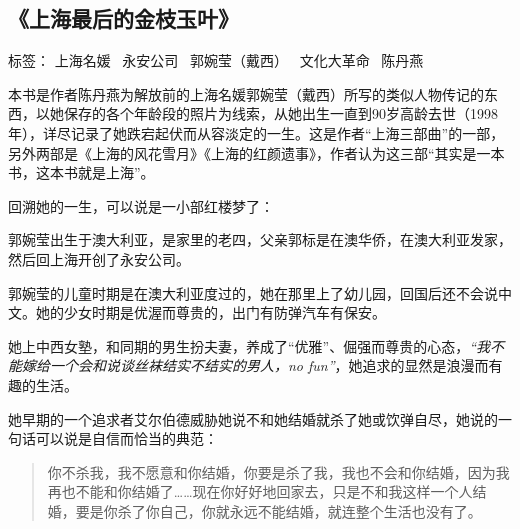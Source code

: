 \subsection{《上海最后的金枝玉叶》}

标签： 上海名媛 \ 永安公司 \ 郭婉莹（戴西） \ 文化大革命 \ 陈丹燕

本书是作者陈丹燕为解放前的上海名媛郭婉莹（戴西）所写的类似人物传记的东西，以她保存的各个年龄段的照片为线索，从她出生一直到90岁高龄去世（1998年），详尽记录了她跌宕起伏而从容淡定的一生。这是作者“上海三部曲”的一部，另外两部是《上海的风花雪月》《上海的红颜遗事》，作者认为这三部“其实是一本书，这本书就是上海”。

回溯她的一生，可以说是一小部红楼梦了：
\begin{itemize*}
    \item 郭婉莹出生于澳大利亚，是家里的老四，父亲郭标是在澳华侨，在澳大利亚发家，然后回上海开创了永安公司。
    \item 郭婉莹的儿童时期是在澳大利亚度过的，她在那里上了幼儿园，回国后还不会说中文。她的少女时期是优渥而尊贵的，出门有防弹汽车有保安。
    \item 她上中西女塾，和同期的男生扮夫妻，养成了“优雅”、倔强而尊贵的心态，\emph{“我不能嫁给一个会和说谈丝袜结实不结实的男人，no fun”}，她追求的显然是浪漫而有趣的生活。
    \item 她早期的一个追求者艾尔伯德威胁她说不和她结婚就杀了她或饮弹自尽，她说的一句话可以说是自信而恰当的典范：
    \begin{quotation}
你不杀我，我不愿意和你结婚，你要是杀了我，我也不会和你结婚，因为我再也不能和你结婚了……现在你好好地回家去，只是不和我这样一个人结婚，要是你杀了你自己，你就永远不能结婚，就连整个生活也没有了。
    \end{quotation}


\end{itemize*}
